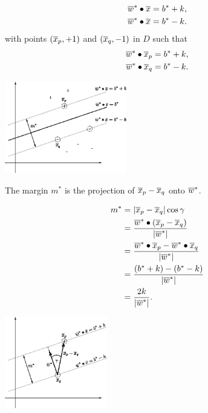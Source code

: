 \documentclass[a4paper,blends,pdf,colorBG,slideColor]{prosper}
\begin{document}
\begin{minipage}{2in}
\begin{align*}
\overline{w}^*\bullet\overline{x} = b^* + k,\\
\overline{w}^*\bullet\overline{x} = b^* - k.
\end{align*}
with points $(\overline{x}_p, +1)$ and  $(\overline{x}_q, -1)$ in $D$ such that
\begin{align*}
\overline{w}^*\bullet\overline{x}_p = b^* + k,\\
\overline{w}^*\bullet\overline{x}_q = b^* - k.
\end{align*}
\end{minipage}
\begin{minipage}{2in}
\includegraphics[height=40mm]{figures/fig06-05.eps}
\end{minipage}
\es


The margin $m^*$ is the projection of $\overline{x}_p - \overline{x}_q$ onto $\overline{w}^*$.
\vspace{.2in}

\begin{minipage}{2in}
\begin{equation*}
\begin{aligned}
m^* &= |{\overline{x}_p - \overline{x}_q}| \cos \gamma\\
	&= \frac{\overline{w}^*\bullet(\overline{x}_p - \overline{x}_q)}{|{\overline{w}^*}|}	\\
	&=\frac{\overline{w}^*\bullet\overline{x}_p - \overline{w}^*\bullet\overline{x}_q}{|{\overline{w}^*}|}\\
	&= \frac{(b^*+k)-(b^*-k)}{|{\overline{w}^*}|} \\
	&=\frac{2 k}{|{\overline{w}^*}|}.
\end{aligned}
\end{equation*}
\end{minipage}
\begin{minipage}{2in}
\includegraphics[height=40mm]{figures/fig06-06.eps}
\end{minipage}
\end{document}
